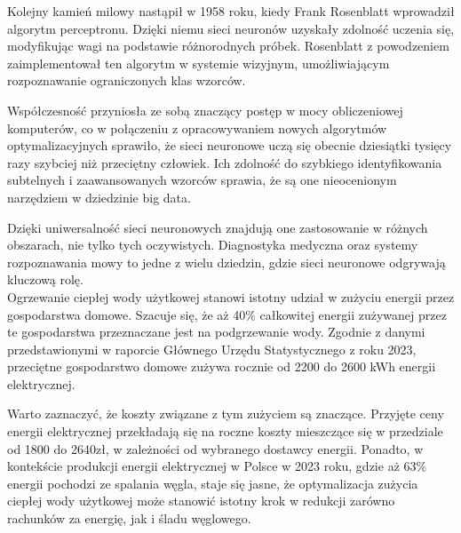 \documentclass[a4paper,twoside,12pt]{book}
\begin{document}
Kolejny kamień milowy nastąpił w 1958 roku, kiedy Frank Rosenblatt wprowadził algorytm perceptronu. Dzięki niemu sieci neuronów uzyskały zdolność uczenia się, modyfikując wagi na podstawie różnorodnych próbek. Rosenblatt z powodzeniem zaimplementował ten algorytm w systemie wizyjnym, umożliwiającym rozpoznawanie ograniczonych klas wzorców.

Współczesność przyniosła ze sobą znaczący postęp w mocy obliczeniowej komputerów, co w połączeniu z opracowywaniem nowych algorytmów optymalizacyjnych sprawiło, że sieci neuronowe uczą się obecnie dziesiątki tysięcy razy szybciej niż przeciętny człowiek. Ich zdolność do szybkiego identyfikowania subtelnych i zaawansowanych wzorców sprawia, że są one nieocenionym narzędziem w dziedzinie big data.

Dzięki uniwersalność sieci neuronowych znajdują one zastosowanie w różnych obszarach, nie tylko tych oczywistych. Diagnostyka medyczna oraz systemy rozpoznawania mowy to jedne z wielu dziedzin, gdzie sieci neuronowe odgrywają kluczową rolę.\\

Ogrzewanie ciepłej wody użytkowej stanowi istotny udział w zużyciu energii przez gospodarstwa domowe. Szacuje się, że aż 40\% całkowitej energii zużywanej przez te gospodarstwa przeznaczane jest na podgrzewanie wody\cite{bib:uzycie_wody}. Zgodnie z danymi przedstawionymi w raporcie Głównego Urzędu Statystycznego z roku 2023, przeciętne gospodarstwo domowe zużywa rocznie od 2200 do 2600 kWh energii elektrycznej\cite{bib:GUS}.

Warto zaznaczyć, że koszty związane z tym zużyciem są znaczące. Przyjęte ceny energii elektrycznej przekładają się na roczne koszty mieszczące się w przedziale od 1800 do 2640zł, w zależności od wybranego dostawcy energii. Ponadto, w kontekście produkcji energii elektrycznej w Polsce w 2023 roku, gdzie aż 63\% energii pochodzi ze spalania węgla\cite{bib:wegiel}, staje się jasne, że optymalizacja zużycia ciepłej wody użytkowej może stanowić istotny krok w redukcji zarówno rachunków za energię, jak i śladu węglowego.
\end{document}
